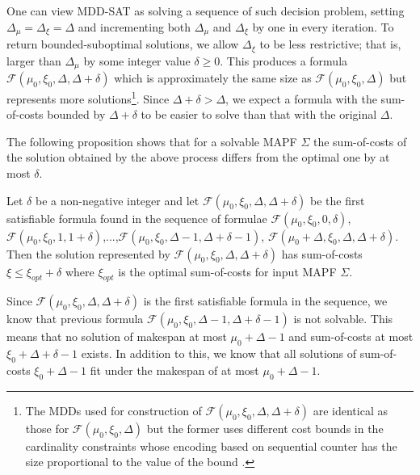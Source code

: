 \documentclass[jair,oneside,11pt]{article}
\begin{document}
One can view MDD-SAT as solving a sequence of such decision problem, setting $\Delta_\mu=\Delta_\xi=\Delta$ and incrementing both $\Delta_\mu$ and $\Delta_\xi$ by one in every iteration.  To return bounded-suboptimal solutions, we allow $\Delta_\xi$ to be less restrictive; that is, larger than $\Delta_\mu$ by some integer value $\delta\geq 0$. 
This produces a formula  $\mathcal{F}(\mu_0,\xi_0, \Delta, \Delta+\delta)$ which is approximately the same size as $\mathcal{F}(\mu_0,\xi_0, \Delta)$ but represents more solutions\footnote{The MDDs used for construction of $\mathcal{F}(\mu_0,\xi_0, \Delta, \Delta+\delta)$ are identical as those for $\mathcal{F}(\mu_0,\xi_0, \Delta)$ but the former uses different cost bounds in the cardinality constraints whose encoding based on sequential counter has the size proportional to the value of the bound \cite{DBLP:conf/cp/Sinz05}.}. Since $\Delta+\delta>\Delta$, we expect a formula with the sum-of-costs bounded by $\Delta+\delta$ to be easier to solve than that with the original $\Delta$.


The following proposition shows that for a solvable MAPF $\Sigma$ the sum-of-costs of the solution obtained by the above process differs from the optimal one by at most $\delta$.

\begin{proposition}
Let $\delta$ be a non-negative integer and let $\mathcal{F}(\mu_0, \xi_0, \Delta, \Delta+\delta)$ be the first satisfiable formula found in the sequence of formulae $\mathcal{F}(\mu_0, \xi_0, 0, \delta)$, $\mathcal{F}(\mu_0, \xi_0, 1, 1+\delta)$,...,$\mathcal{F}(\mu_0, \xi_0, \Delta-1, \Delta+\delta-1)$, $\mathcal{F}(\mu_0+\Delta, \xi_0, \Delta, \Delta+\delta)$. Then the solution represented by $\mathcal{F}(\mu_0, \xi_0, \Delta,\Delta+\delta)$ has sum-of-costs $\xi \leq \xi_{opt} + \delta$ where $\xi_{opt}$ is the optimal sum-of-costs for input MAPF $\Sigma$.
\label{prop:bound}
\end{proposition}

 Since $\mathcal{F}(\mu_0, \xi_0, \Delta,\Delta+\delta)$ is the first satisfiable formula in the sequence, we know that previous formula $\mathcal{F}(\mu_0,\xi_0,\Delta-1,\Delta+\delta-1)$ is not solvable. This means that no solution of makespan at most $\mu_0+\Delta-1$ and sum-of-costs at most $\xi_0+\Delta+\delta - 1$ exists. In addition to this, we know that all solutions of sum-of-costs $\xi_0+\Delta-1$ fit under the makespan of at most $\mu_0+\Delta-1$.
\end{document}
